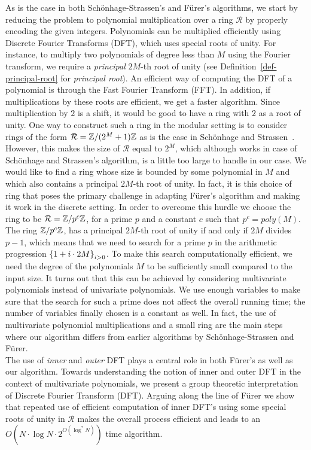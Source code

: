 \documentclass[11pt]{article}
\renewcommand{\R}{\mathcal{R}} %
\begin{document}
As is the case in both Sch\"{o}nhage-Strassen's and F\"{u}rer's
algorithms, we start by reducing the problem to polynomial
multiplication over a ring $\R$ by properly encoding the given
integers. Polynomials can be multiplied efficiently using Discrete
Fourier Transforms (DFT), which uses special roots of unity. For
instance, to multiply two polynomials of degree less than $M$ using
the Fourier transform, we require a \emph{principal} $2M$-th root of
unity (see Definition~\ref{def-principal-root} for \emph{principal
  root}). An efficient way of computing the DFT of a polynomial is
through the Fast Fourier Transform (FFT). In addition, if
multiplications by these roots are efficient, we get a faster
algorithm. Since multiplication by $2$ is a shift, it would be good to
have a ring with $2$ as a root of unity. One way to construct such a
ring in the modular setting is to consider rings of the form $\R =
\Z/(2^M + 1) \Z$ as is the case in Sch\"{o}nhage and
Strassen~\cite{scho}. However, this makes the size of $\R$ equal to
$2^M$, which although works in case of Sch\"{o}nhage and Strassen's
algorithm, is a little too large to handle in our case. We would
like to find a ring whose size is bounded by some polynomial in $M$
and which also contains a principal $2M$-th root of unity. In fact, it
is this choice of ring that poses the primary challenge in adapting
F\"{u}rer's algorithm and making it work in the discrete setting. In
order to overcome this hurdle we choose the ring to be $\R =
\Z/p^c\Z$, for a prime $p$ and a constant $c$ such that $p^c =
poly(M)$. The ring $\mathbb{Z}/p^c\mathbb{Z}$, has a principal $2M$-th root of unity
if and only if $2M$ divides $p-1$, which means that we need to search
for a prime $p$ in the arithmetic progression $\left\{1 + i\cdot
  2M\right\}_{i>0}$. To make this search computationally efficient, we need
the degree of the polynomials $M$ to be sufficiently small compared to
the input size. It turns out that this can be achieved by considering
multivariate polynomials instead of univariate polynomials. We use
enough variables to make sure that the search for such a prime does
not affect the overall running time; the number of variables finally
chosen is a constant as well. In fact, the use of multivariate
polynomial multiplications and a small ring are the main steps where
our algorithm differs {}from earlier algorithms by
Sch\"{o}nhage-Strassen and F\"{u}rer.\\

The use of \emph{inner} and \emph{outer} DFT plays a central role in
both F\"{u}rer's as well as our algorithm. Towards understanding the
notion of inner and outer DFT in the context of multivariate
polynomials, we present a group theoretic interpretation of Discrete
Fourier Transform (DFT). Arguing along the line of F\"{u}rer
\cite{Furer} we show that repeated use of efficient computation of
inner DFT's using some special roots of unity in $\R$ makes the
overall process efficient and leads to an $O(N\cdot \log{N}\cdot
2^{O(\log^{*}{N})})$ time algorithm.
\end{document}
